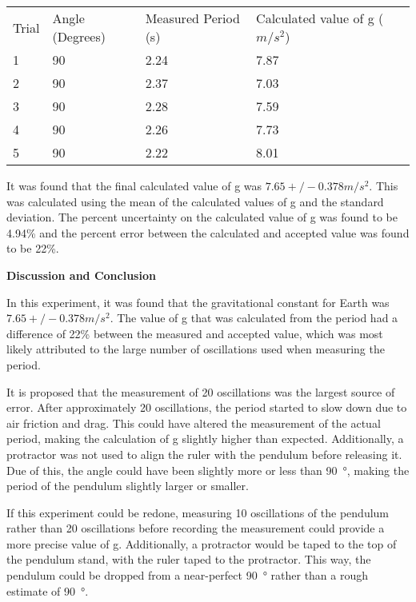 \begin{table}[H]
\begin{tabular}{|l|l|l|l|l}
\cline{1-4}
Trial & Angle (Degrees) & Measured Period (s) & Calculated value of g ($m/s^2$) &  \\ \cline{1-4}
1     & 90              & 2.24                & 7.87                         &  \\ \cline{1-4}
2     & 90              & 2.37                & 7.03                         &  \\ \cline{1-4}
3     & 90              & 2.28                & 7.59                         &  \\ \cline{1-4}
4     & 90              & 2.26                & 7.73                         &  \\ \cline{1-4}
5     & 90              & 2.22                & 8.01                         &  \\ \cline{1-4}
\end{tabular}
\end{table}

It was found that the final calculated value of g was $\SI{7.65}+/- {0.378}{m/s^2}$. This was calculated using the mean of the calculated values of g and the standard deviation. The percent uncertainty on the calculated value of g was found to be 4.94\% and the percent error between the calculated and accepted value was found to be 22\%.

\textbf{Discussion and Conclusion}

In this experiment, it was found that the gravitational constant for Earth was $\SI{7.65}+/- {0.378}{m/s^2}$. The value of g that was calculated from the period had a difference of 22\% between the measured and accepted value, which was most likely attributed to the large number of oscillations used when measuring the period.

It is proposed that the measurement of 20 oscillations was the largest source of error. After approximately 20 oscillations, the period started to slow down due to air friction and drag. This could have altered the measurement of the actual period, making the calculation of g slightly higher than expected. Additionally, a protractor was not used to align the ruler with the pendulum before releasing it. Due of this, the angle could have been slightly more or less than \SI{90}{\degree}, making the period of the pendulum slightly larger or smaller. 

If this experiment could be redone, measuring 10 oscillations of the pendulum rather than 20 oscillations before recording the measurement could provide a more precise value of g. Additionally, a protractor would be taped to the top of the pendulum stand, with the ruler taped to the protractor. This way, the pendulum could be dropped from a near-perfect \SI{90}{\degree} rather than a rough estimate of \SI{90}{\degree}. 

